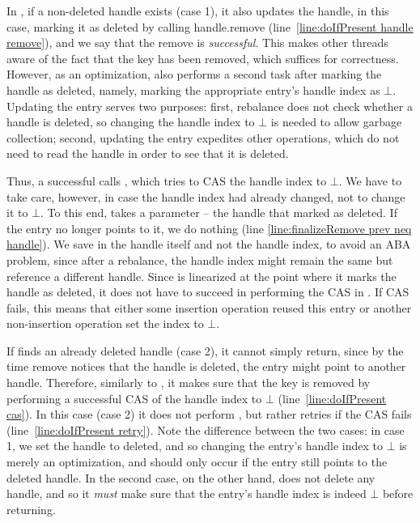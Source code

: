 In , 
if a non-deleted handle exists (case 1),  it also updates the handle, in this case, marking it as deleted by calling handle.remove (line~\ref{line:doIfPresent handle remove}), 
and we say that the remove is \emph{successful}.
This makes  other threads aware of the fact that the key has been removed, 
which suffices for correctness.
However, as an optimization,  also performs a second task after marking the handle as deleted, namely, marking the appropriate entry's handle index as $\bot$. 
Updating the entry serves two purposes:
first, rebalance does not check whether a handle is deleted,
so changing the handle index to $\bot$ is needed to allow garbage collection;
second, updating the entry expedites other operations, which do not need to read the handle in order to see that it is deleted. 

Thus, a successful    calls  , which  tries to CAS the handle index to $\bot$.
We have to take care, however, in case the handle index had already changed, not to change it to $\bot$. 
To this end,   takes a parameter  -- the handle  that  marked as deleted. 
If the entry no longer points to it, we do nothing (line \ref{line:finalizeRemove prev neq handle}).
We save in  the handle itself and not the handle index, to avoid an ABA problem, since after a rebalance, the handle index might remain the same but reference a different handle. 
Since    is linearized at the point where it marks the handle as deleted, it does not have to succeed in performing the CAS in   .
If CAS fails, this means that either some insertion operation reused this entry or another non-insertion operation  set the  index to $\bot$.

If    finds an already deleted handle (case 2), it cannot simply return, since by the time remove notices that the handle is deleted, the entry might point to another handle.
Therefore, similarly to , it makes sure that the key is removed by performing a successful CAS of the handle index to $\bot$ (line~\ref{line:doIfPresent cas}).
In this case (case 2) it does not perform , but rather retries if the CAS fails (line~\ref{line:doIfPresent retry}).
Note the difference between the two cases: in case 1, we set the handle to deleted, and so changing the entry's handle index to $\bot$ is merely an optimization, and should only occur if the entry still points to the deleted handle. 
In the second case, on the other hand,  does not delete any handle, and so it \emph{must} make sure that the entry's handle index is indeed $\bot$ before returning. 


